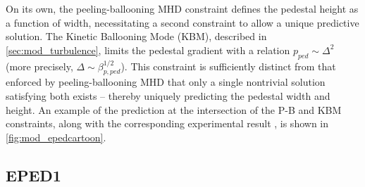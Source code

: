 On its own, the peeling-ballooning MHD constraint defines the pedestal height as a function of width, necessitating a second constraint to allow a unique predictive solution.  The Kinetic Ballooning Mode (KBM), described in \cref{sec:mod_turbulence}, limits the pedestal gradient with a relation $p_{ped} \sim \Delta^2$ (more precisely, $\Delta \sim \beta_{p,ped}^{1/2}$).  This constraint is sufficiently distinct from that enforced by peeling-ballooning MHD  that only a single nontrivial solution satisfying both exists -- thereby uniquely predicting the pedestal width and height.  An example of the prediction at the intersection of the P-B and KBM constraints, along with the corresponding experimental result \cite{Snyder2011}, is shown in \cref{fig:mod_epedcartoon}.

\begin{figure}[ht]
 \pushtooutside
\end{figure}

\subsection{EPED1}\label{subsec:mod_eped1}

